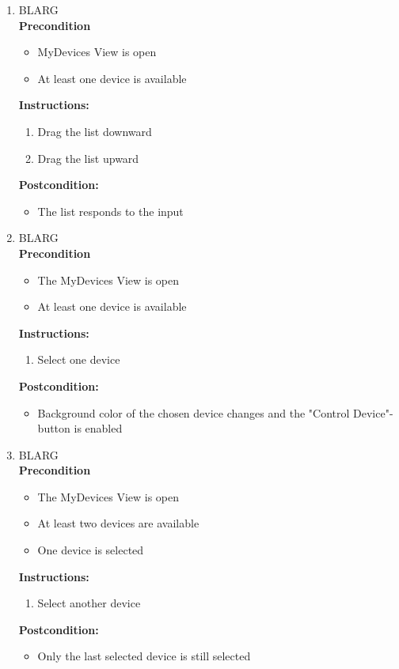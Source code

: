 \documentclass[a4paper]{article}
\newlength{\testlabellength}
\newenvironment{testlist}{\begin{enumerate}[label=\bfseries Instruction \thesubsection.\arabic* , labelindent=0pt, labelwidth=\testlabellength , leftmargin=2cm]}{\end{enumerate}}
\newenvironment{precondition}{
{\color{white}BLARG}\\ 
\textbf{Precondition}
\begin{itemize}[labelindent=0cm, labelwidth=2cm , leftmargin=1cm]
}
{\end{itemize}}
\newenvironment{instruction}{
\textbf{Instructions:}
\begin{enumerate}[label=\bfseries  \arabic*., labelindent=0cm, labelwidth=2cm , leftmargin=1cm]
}
{\end{enumerate}}
\newenvironment{postcondition}{
\textbf{Postcondition:}
\begin{itemize}[labelindent=0cm, labelwidth=2cm , leftmargin=1cm]
}
{\end{itemize}}
\begin{document}
\begin{appendices}
\begin{testlist}
    \item	
    	\begin{precondition}
    		\item MyDevices View is open
    		\item At least one device is available
    	\end{precondition}
    	\begin{instruction}
			\item Drag the list downward
			\item Drag the list upward
		\end{instruction}
		\begin{postcondition}
			\item The list responds to the input
		\end{postcondition}
   
    \item
    	\begin{precondition}
    		\item The MyDevices View is open
    		\item At least one device is available
    	\end{precondition}
		\begin{instruction}
			\item Select one device
		\end{instruction}
		\begin{postcondition}
			\item Background color of the chosen device changes and the "Control Device"-button is enabled
		\end{postcondition}
   
    \item 
   		\begin{precondition}
   			\item The MyDevices View is open
   			\item At least two devices are available
   			\item One device is selected
   		\end{precondition}
   		\begin{instruction}
   			\item Select another device
   		\end{instruction}
   		\begin{postcondition}
   			\item Only the last selected device is still selected
   		\end{postcondition}
    

\end{testlist}
\end{appendices}
\end{document}
